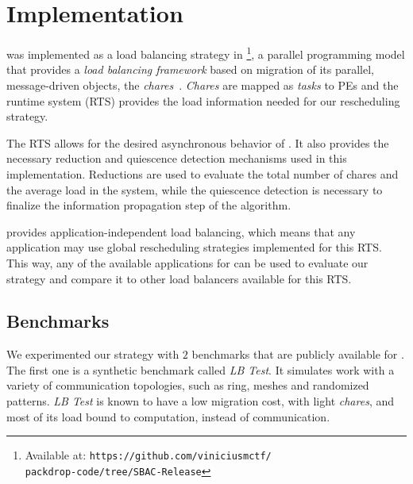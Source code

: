 \section{Implementation} \label{sec:impl}

\packdrop was implemented as a load balancing strategy in \charm\footnote{Available at: \texttt{https://github.com/viniciusmctf/\\packdrop-code/tree/SBAC-Release}}, a parallel programming model that provides a \textit{load balancing framework} based on migration of its parallel, message-driven objects, the \textit{chares}~\cite{CharmLOTR,sc14charm}.
\textit{Chares} are mapped as \textit{tasks} to PEs and the \charm runtime system (RTS) provides the load information needed for our rescheduling strategy.

The \charm RTS allows for the desired asynchronous behavior of \packdrop.
It also provides the necessary reduction and quiescence detection mechanisms used in this implementation.
Reductions are used to evaluate the total number of chares and the average load in the system, while the quiescence detection is necessary to finalize the information propagation step of the algorithm.

\charm provides application-independent load balancing, which means that any application may use global rescheduling strategies implemented for this RTS.
This way, any of the available applications for \charm can be used to evaluate our strategy and compare it to other load balancers available for this RTS.


\subsection{Benchmarks} \label{sec:benchmarks}

We experimented our strategy with $2$ benchmarks that are publicly available for \charm.
The first one is a synthetic benchmark called \textit{LB Test}. 
It simulates work with a variety of communication topologies, such as ring, meshes and randomized patterns.
\textit{LB Test} is known to have a low migration cost, with light \textit{chares}, and most of its load bound to computation, instead of communication.

